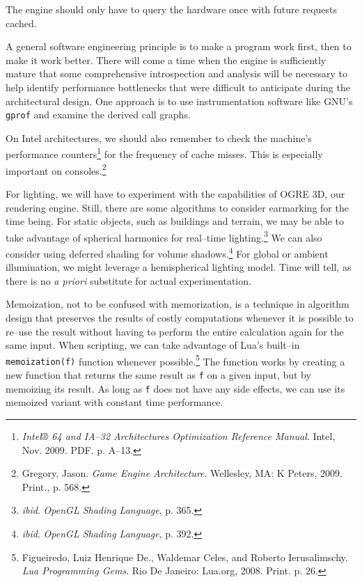 The engine should only have to query the hardware once with future requests cached.

A general software engineering principle is to make a program work first, then to make it work better. There will come a time when the engine is sufficiently mature that some comprehensive introspection and analysis will be necessary to help identify performance bottlenecks that were difficult to anticipate during the architectural design. One approach is to use instrumentation software like GNU's {\tt gprof} and examine the derived call graphs.

On Intel architectures, we should also remember to check the machine's performance counters\footnote{{\it Intel® 64 and IA--32 Architectures Optimization Reference Manual}. Intel, Nov. 2009. PDF. p. A--13.} for the frequency of cache misses. This is especially important on consoles.\footnote{Gregory, Jason. {\it Game Engine Architecture}. Wellesley, MA: K Peters, 2009. Print., p. 568.}

For lighting, we will have to experiment with the capabilities of OGRE 3D, our rendering engine. Still, there are some algorithms to consider earmarking for the time being. For static objects, such as buildings and terrain, we may be able to take advantage of spherical harmonics for real--time lighting.\footnote{{\it ibid}. {\it OpenGL Shading Language}, p. 365.} We can also consider using deferred shading for volume shadows.\footnote{{\it ibid}. {\it OpenGL Shading Language}, p. 392.} For global or ambient illumination, we might leverage a hemispherical lighting model. Time will tell, as there is no {\it a priori} substitute for actual experimentation.

Memoization, not to be confused with memorization, is a technique in algorithm design that preserves the results of costly computations whenever it is possible to re--use the result without having to perform the entire calculation again for the same input. When scripting, we can take advantage of Lua's built--in {\tt memoization(f)} function whenever possible.\footnote{ Figueiredo, Luiz Henrique De., Waldemar Celes, and Roberto Ierusalimschy. {\it Lua Programming Gems}. Rio De Janeiro: Lua.org, 2008. Print. p. 26.} The function works by creating a new function that returns the same result as {\tt f} on a given input, but by memoizing its result. As long as {\tt f} does not have any side effects, we can use its memoized variant with constant time performance.

